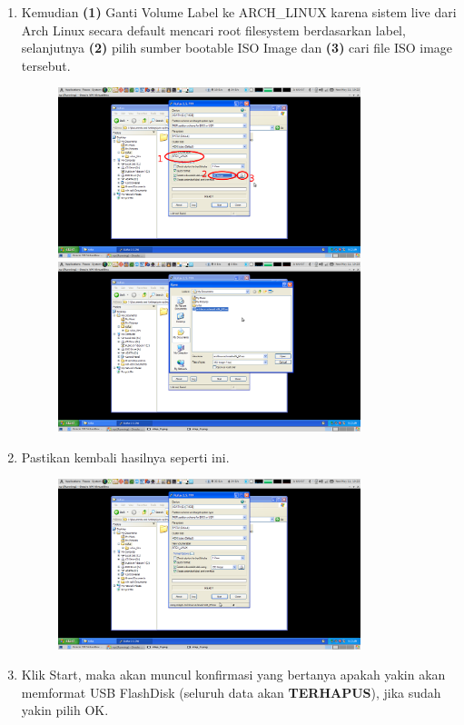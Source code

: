 \documentclass[12pt,]{article}
\begin{document}
\begin{enumerate}
		\item Kemudian \textbf{(1)} Ganti Volume Label ke ARCH\_LINUX karena sistem live dari Arch Linux secara default mencari root filesystem berdasarkan label,
		selanjutnya \textbf{(2)} pilih sumber bootable ISO Image
		dan \textbf{(3)} cari file ISO image tersebut.
		
		\begin{figure}[!ht]
			\centering
			\includegraphics[width=250pt]{usbwin/step_4}
			\includegraphics[width=250pt]{usbwin/step_5}
		\end{figure}
	
		\item Pastikan kembali hasilnya seperti ini.
		
		\newpage
		\begin{figure}[!ht]
			\centering
			\includegraphics[width=250pt]{usbwin/step_6}
		\end{figure}
	
		\item Klik Start, maka akan muncul konfirmasi yang bertanya apakah yakin akan memformat USB FlashDisk (seluruh data akan \textbf{TERHAPUS}),
		jika sudah yakin pilih OK.


\end{enumerate}
\end{document}
